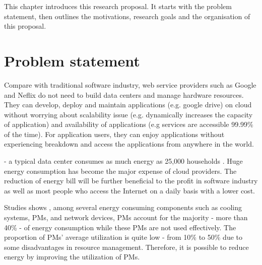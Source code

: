 This chapter introduces this research proposal. It starts with the problem statement, then outlines the motivations, research goals and the organisation of this proposal.

\section{Problem statement}

 Compare with traditional software industry, web service providers such as Google and Neflix do not need to build data centers and manage hardware resources. They can develop, deploy and maintain applications (e.g. google drive) on cloud \cite{adhikari:2012uq} without worrying about scalability issue (e.g. dynamically increases the capacity of application) and availability of applications (e.g services are accessible 99.99\% of the time). For application users, they can enjoy applications without experiencing breakdown and access the applications from anywhere in the world.

 - a typical data center consumes as much energy as 25,000 households \cite{dayarathna:2016ua}. Huge energy consumption has become the major expense of cloud providers. The reduction of energy bill will be further beneficial to the profit in software industry as well as most people who access the Internet on a daily basis with a lower cost.

 Studies shows \cite{Barroso:2007jt, Shen:2015hm}, among several energy consuming components such as cooling systems, PMs, and network devices, PMs account for the majority - more than 40\% - of energy consumption while these PMs are not used effectively. The proportion of PMs' average utilization is quite low - from 10\% to 50\% due to some disadvantages in resource management. Therefore, it is possible to reduce energy by improving the utilization of PMs.

